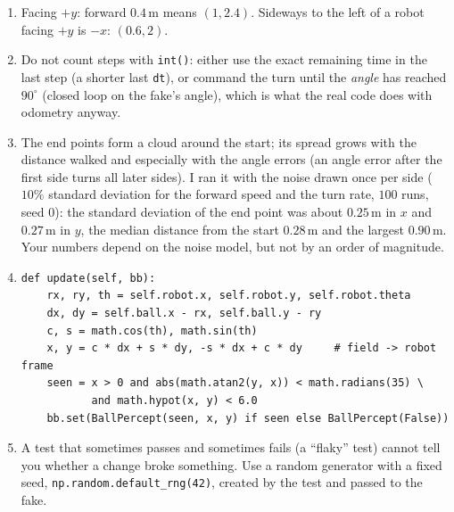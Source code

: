 \begin{enumerate}[label=\textbf{\ansnum.\arabic*}]
  \item Facing $+y$: forward $0.4$\,m means $(1,2.4)$. Sideways to the left of a robot facing $+y$ is $-x$: $(0.6,2)$.
  \item Do not count steps with \verb!int()!: either use the exact remaining time in the last step (a shorter last \texttt{dt}), or command the turn until the \emph{angle} has reached $90^\circ$ (closed loop on the fake's angle), which is what the real code does with odometry anyway.
  \item The end points form a cloud around the start; its spread grows with the distance walked and especially with the angle errors (an angle error after the first side turns all later sides). I ran it with the noise drawn once per side ($10\%$ standard deviation for the forward speed and the turn rate, $100$ runs, seed $0$): the standard deviation of the end point was about $0.25$\,m in $x$ and $0.27$\,m in $y$, the median distance from the start $0.28$\,m and the largest $0.90$\,m. Your numbers depend on the noise model, but not by an order of magnitude.
  \item
\begin{verbatim}
def update(self, bb):
    rx, ry, th = self.robot.x, self.robot.y, self.robot.theta
    dx, dy = self.ball.x - rx, self.ball.y - ry
    c, s = math.cos(th), math.sin(th)
    x, y = c * dx + s * dy, -s * dx + c * dy     # field -> robot frame
    seen = x > 0 and abs(math.atan2(y, x)) < math.radians(35) \
           and math.hypot(x, y) < 6.0
    bb.set(BallPercept(seen, x, y) if seen else BallPercept(False))
\end{verbatim}
  \item A test that sometimes passes and sometimes fails (a ``flaky'' test) cannot tell you whether a change broke something. Use a random generator with a fixed seed, \verb!np.random.default_rng(42)!, created by the test and passed to the fake.
\end{enumerate}
